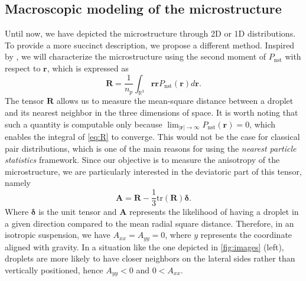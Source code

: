 \subsection{Macroscopic modeling of the microstructure}
Until now, we have depicted the microstructure through 2D or 1D distributions. To provide a more succinct description, we propose a different method. 
Inspired by \citet{zhang2023evolution}, we will characterize the microstructure using the second moment of $P_\text{nst}$ with respect to $\mathbf{r}$, which is expressed as
\begin{equation}
    \textbf{R} =\frac{1}{n_p} 
    \int_{\mathbb{R}^3} 
    \textbf{rr} P_\text{nst}(\textbf{r}) d\textbf{r}.
    \label{eq:R}
\end{equation}
The tensor $\textbf{R}$ allows us to measure the mean-square distance between a droplet and its nearest neighbor in the three dimensions of space.
It is worth noting that such a quantity is computable only because $\lim_{|\textbf{r}|\to \infty} P_\text{nst}(\textbf{r}) = 0$, which enables the integral of \ref{eq:R} to converge. 
This would not be the case for classical pair distributions, which is one of the main reasons for using the \textit{nearest particle statistics} framework. Since our objective is to measure the anisotropy of the microstructure, we are particularly interested in the deviatoric part of this tensor, namely
\begin{equation*}
    \textbf{A} = \textbf{R} - \frac{1}{3}  \text{tr}(\textbf{R}) \bm\delta.
\end{equation*}
Where $\bm\delta$ is the unit tensor and 
$\textbf{A}$ represents the likelihood of having a droplet in a given direction compared to the mean radial square distance. 
Therefore, in an isotropic suspension, we have $A_{xx} = A_{yy} = 0$, where $y$ represents the coordinate aligned with gravity. 
In a situation like the one depicted in \ref{fig:images} (left), droplets are more likely to have closer neighbors on the lateral sides rather than vertically positioned, hence  $A_{yy} < 0$ and $0 < A_{xx}$. 



